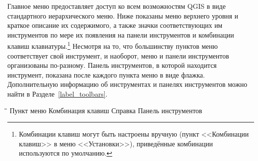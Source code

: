 Главное меню предоставляет доступ ко всем возможностям QGIS в виде
стандартного иерархического меню. Ниже показаны меню верхнего уровня
и краткое описание их содержимого, а также значки соответствующих им
инструментов по мере их появления на панели инструментов и комбинации
клавиш клавиатуры.\footnote{Комбинации клавиш могут быть настроены вручную (пункт
<<Комбинации клавиш>> в меню <<Установки>>), приведённые комбинации используются
по умолчанию.}
Несмотря на то, что большинству пунктов меню соответствует свой инструмент,
и наоборот, меню и панели инструментов организованы по-разному.
Панель инструментов, в которой находится инструмент, показана после каждого
пункта меню в виде флажка. Дополнительную информацию об инструментах
и панелях инструментов можно найти в Разделе~\ref{label_toolbars}.

\begin{tabbing}
\hspace{5.5cm}\=\hspace{3cm}\=\hspace{3.5cm}\= \kill
\hspace{1cm} Пункт меню \> Комбинация клавиш \> Справка \> Панель инструментов\\
\end{tabbing}

